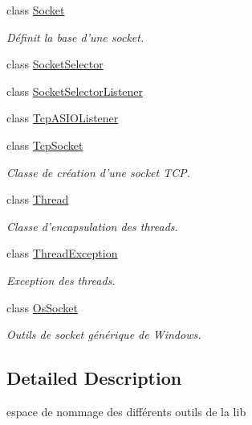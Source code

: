 \begin{DoxyCompactItemize}
class \hyperlink{classmognetwork_1_1_socket}{Socket}
\begin{DoxyCompactList}\small\item\em Définit la base d'une socket. \end{DoxyCompactList}\item 
class \hyperlink{classmognetwork_1_1_socket_selector}{Socket\-Selector}
\item 
class \hyperlink{classmognetwork_1_1_socket_selector_listener}{Socket\-Selector\-Listener}
\item 
class \hyperlink{classmognetwork_1_1_tcp_a_s_i_o_listener}{Tcp\-A\-S\-I\-O\-Listener}
\item 
class \hyperlink{classmognetwork_1_1_tcp_socket}{Tcp\-Socket}
\begin{DoxyCompactList}\small\item\em Classe de création d'une socket T\-C\-P. \end{DoxyCompactList}\item 
class \hyperlink{classmognetwork_1_1_thread}{Thread}
\begin{DoxyCompactList}\small\item\em Classe d'encapsulation des threads. \end{DoxyCompactList}\item 
class \hyperlink{classmognetwork_1_1_thread_exception}{Thread\-Exception}
\begin{DoxyCompactList}\small\item\em Exception des threads. \end{DoxyCompactList}\item 
class \hyperlink{classmognetwork_1_1_os_socket}{Os\-Socket}
\begin{DoxyCompactList}\small\item\em Outils de socket générique de Windows. \end{DoxyCompactList}\end{DoxyCompactItemize}


\subsection{Detailed Description}
espace de nommage des différents outils de la lib 